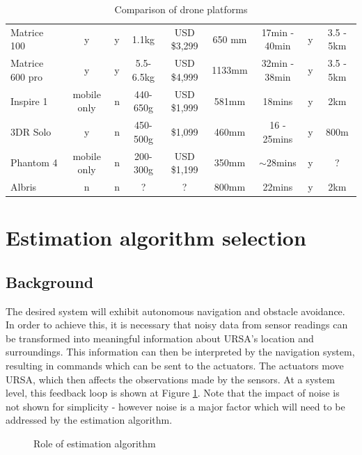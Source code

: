 \documentclass[capstone_report.tex]{subfiles}
\begin{document}
{\begin{table}
\begin{tabular}{@{}lcccccccc@{}}
Matrice 100            & y           & y   & 1.1kg              & USD \$3,299  & 650 mm & 17min - 40min & y           & 3.5 - 5km             \\
Matrice 600 pro        & y           & y   & 5.5-6.5kg          & USD \$4,999  & 1133mm & 32min - 38min & y           & 3.5 - 5km             \\
Inspire 1              & mobile only & n   & 440-650g           & USD \$1,999  & 581mm  & 18mins        & y           & 2km                   \\
3DR Solo               & y           & n   & 450-500g           & \$1,099      & 460mm  & 16 - 25mins   & y           & 800m                  \\
Phantom 4              & mobile only & n   & 200-300g           & USD \$1,199  & 350mm  & $\sim$28mins  & y           & ?                     \\
Albris                 & n           & n   & ?                  & ?            & 800mm  & 22mins        & y           & 2km                   \\ \bottomrule
\end{tabular}
\caption{Comparison of drone platforms}
\label{comparison}
\end{table}\clearpage}

    \section{Estimation algorithm selection}
    \subsection{Background}
    The desired system will exhibit autonomous navigation and obstacle avoidance. In order to achieve this, it is necessary that noisy data from sensor readings can be transformed into meaningful information about URSA's location and surroundings. This information can then be interpreted by the navigation system, resulting in commands which can be sent to the actuators. The actuators move URSA, which then affects the observations made by the sensors. At a system level, this feedback loop is shown at Figure \ref{fig:estAlg1}. Note that the impact of noise is not shown for simplicity - however noise is a major factor which will need to be addressed by the estimation algorithm.

    \begin{figure}[H]
    	
    	\caption{Role of estimation algorithm\label{fig:estAlg1}}
    \end{figure}
\end{document}

